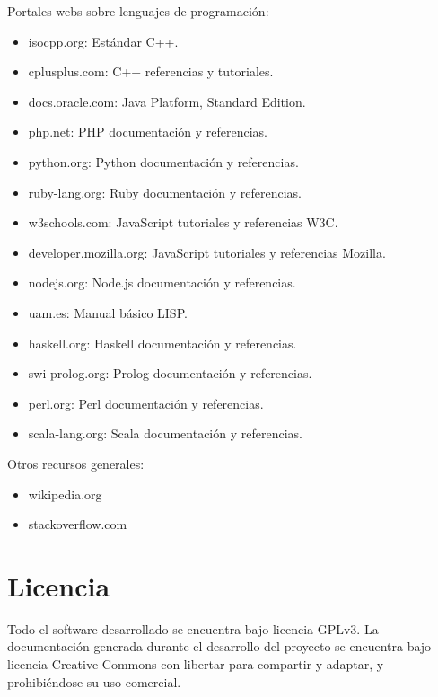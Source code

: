 Portales webs sobre lenguajes de programación:
\begin{itemize}
\item isocpp.org: Estándar C++.
\item cplusplus.com: C++ referencias y tutoriales.
\item docs.oracle.com: Java Platform, Standard Edition.
\item php.net: PHP documentación y referencias.
\item python.org: Python documentación y referencias.
\item ruby-lang.org: Ruby documentación y referencias.
\item w3schools.com: JavaScript tutoriales y referencias W3C.
\item developer.mozilla.org: JavaScript tutoriales y referencias Mozilla.
\item nodejs.org: Node.js documentación y referencias.
\item uam.es: Manual básico LISP.
\item haskell.org: Haskell documentación y referencias.
\item swi-prolog.org: Prolog documentación y referencias.
\item perl.org: Perl documentación y referencias.
\item scala-lang.org: Scala documentación y referencias.
\end{itemize}
\pagebreak
Otros recursos generales:
\begin{itemize}
\item wikipedia.org
\item stackoverflow.com
\end{itemize}

\section{Licencia}
Todo el software desarrollado se encuentra bajo licencia GPLv3. La documentación generada durante el desarrollo del proyecto se encuentra bajo licencia Creative Commons con libertar para compartir y
adaptar, y prohibiéndose su uso comercial.
